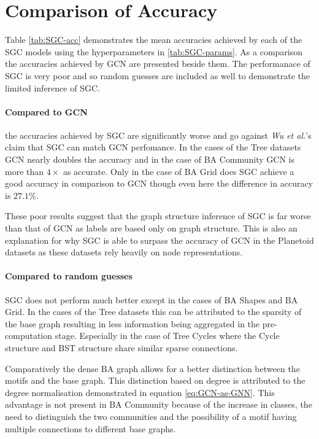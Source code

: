 \section{Comparison of Accuracy}
\label{sec:comp-acc}


Table \ref{tab:SGC-acc} demonstrates the mean accuracies achieved by each of the SGC models using the hyperparameters in \ref{tab:SGC-params}.
As a comparison the accuracies achieved by GCN are presented beside them.
The performanace of SGC is very poor and so random guesses are included as well to demonstrate the limited inference of SGC.

\paragraph{Compared to GCN}
the accuracies achieved by SGC are significantly worse and go against \textit{Wu et al.}'s claim that SGC can match GCN perfomance.
In the cases of the Tree datasets GCN nearly doubles the accuracy and in the case of BA Community GCN is more than $4\times$ as accurate.
Only in the case of BA Grid does SGC achieve a good accuracy in comparison to GCN though even here the difference in accuracy is $27.1$\%.

These poor results suggest that the graph structure inference of SGC is far worse than that of GCN as labels are based only on graph structure.
This is also an explanation for why SGC is able to surpass the accuracy of GCN in the Planetoid\cite{kipf2016semi} datasets as these datasets rely heavily on node representations.

\paragraph{Compared to random guesses}
SGC does not perform much better except in the cases of BA Shapes and BA Grid.
In the cases of the Tree datasets this can be attributed to the sparsity of the base graph resulting in less information being aggregated in the pre-computation stage.
Especially in the case of Tree Cycles where the Cycle structure and BST structure share similar sparse connections.

Comparatively the dense BA graph allows for a better distinction between the motifs and the base graph.
This distinction based on degree is attributed to the degree normalisation demonstrated in equation \ref{eq:GCN-as-GNN}.
This advantage is not present in BA Community because of the increase in classes, the need to distinguish the two communities and the possibility of a motif having multiple connections to different base graphs.

